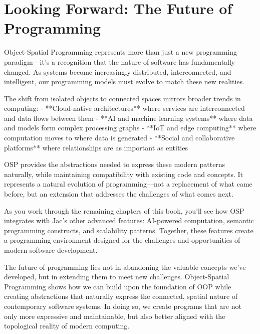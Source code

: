 \section{Looking Forward: The Future of Programming}

Object-Spatial Programming represents more than just a new programming paradigm—it's a recognition that the nature of software has fundamentally changed. As systems become increasingly distributed, interconnected, and intelligent, our programming models must evolve to match these new realities.

The shift from isolated objects to connected spaces mirrors broader trends in computing:
- **Cloud-native architectures** where services are interconnected and data flows between them
- **AI and machine learning systems** where data and models form complex processing graphs
- **IoT and edge computing** where computation moves to where data is generated
- **Social and collaborative platforms** where relationships are as important as entities

OSP provides the abstractions needed to express these modern patterns naturally, while maintaining compatibility with existing code and concepts. It represents a natural evolution of programming—not a replacement of what came before, but an extension that addresses the challenges of what comes next.

As you work through the remaining chapters of this book, you'll see how OSP integrates with Jac's other advanced features: AI-powered computation, semantic programming constructs, and scalability patterns. Together, these features create a programming environment designed for the challenges and opportunities of modern software development.

The future of programming lies not in abandoning the valuable concepts we've developed, but in extending them to meet new challenges. Object-Spatial Programming shows how we can build upon the foundation of OOP while creating abstractions that naturally express the connected, spatial nature of contemporary software systems. In doing so, we create programs that are not only more expressive and maintainable, but also better aligned with the topological reality of modern computing.
